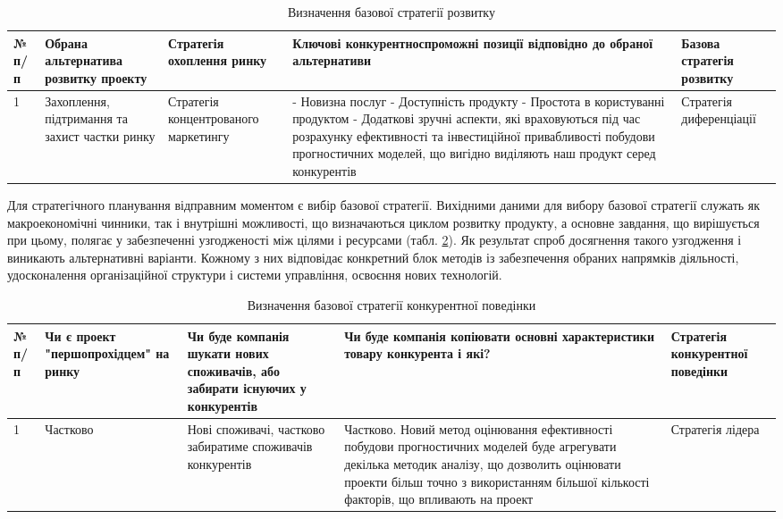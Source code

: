 \begin{table}[h!]
\fontsize{12pt}{12pt}\selectfont
	\begin{tabularx}{\textwidth}{|l|X|X|X|X|}
    \hline
    № п/п & Обрана альтернатива розвитку проекту & Стратегія охоплення ринку & Ключові конкурентноспроможні позиції відповідно до обраної альтернативи & Базова стратегія розвитку \\ \hline
    1 & Захоплення, підтримання та захист частки ринку & Стратегія концентрованого маркетингу & - Новизна послуг
    - Доступність продукту
    - Простота в користуванні продуктом
    - Додаткові зручні аспекти, які враховуються під час розрахунку ефективності та інвестиційної привабливості побудови прогностичних моделей, що вигідно виділяють наш продукт серед конкурентів & Стратегія диференціації \\
    \hline
    \end{tabularx}
\caption{Визначення базової стратегії розвитку} \label{tab:stab_11}
\end{table}

Для стратегічного планування відправним моментом є вибір базової стратегії. Вихідними даними для вибору базової стратегії служать як макроекономічні чинники, так і внутрішні можливості, що визначаються циклом розвитку продукту, а основне завдання, що вирішується при цьому, полягає у забезпеченні узгодженості між цілями і ресурсами (табл. \ref{tab:stab_12}). Як результат спроб досягнення такого узгодження і виникають альтернативні варіанти. Кожному з них відповідає конкретний блок методів із забезпечення обраних напрямків діяльності, удосконалення організаційної структури і системи управління, освоєння нових технологій.

\begin{table}[h!]
\fontsize{12pt}{12pt}\selectfont
	\begin{tabularx}{\textwidth}{|l|X|X|X|X|}
    \hline
    № п/п & Чи є проект "першопрохідцем" на ринку & Чи буде компанія шукати нових споживачів, або забирати існуючих у конкурентів & Чи буде компанія копіювати основні характеристики товару конкурента і які? & Стратегія конкурентної поведінки \\ \hline
    1 & Частково & Нові споживачі, частково забиратиме споживачів конкурентів & Частково. Новий метод оцінювання ефективності побудови прогностичних моделей буде агрегувати декілька методик аналізу, що дозволить оцінювати проекти більш точно з використанням більшої кількості факторів, що впливають на проект & Стратегія лідера \\
    \hline
    \end{tabularx}
\caption{Визначення базової стратегії конкурентної поведінки} \label{tab:stab_12}
\end{table}

